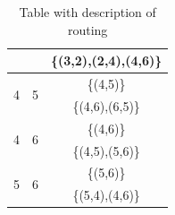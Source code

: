 \begin{table}[h!]
\begin{tabular}{|| c | c | c ||}
 & & \{(3,2),(2,4),(4,6)\} \\ \hline
 \multirow{2}{*}{4} & \multirow{2}{*}{5} & \{(4,5)\}\\
 & & \{(4,6),(6,5)\} \\ \hline
 \multirow{2}{*}{4} & \multirow{2}{*}{6} & \{(4,6)\}\\
 & & \{(4,5),(5,6)\} \\ \hline
 \multirow{2}{*}{5} & \multirow{2}{*}{6} & \{(5,6)\}\\
 & & \{(5,4),(4,6)\} \\
 \hline
\end{tabular}
\caption{Table with description of routing}
\label{path_opaque_protec_ref_high}
\end{table}


